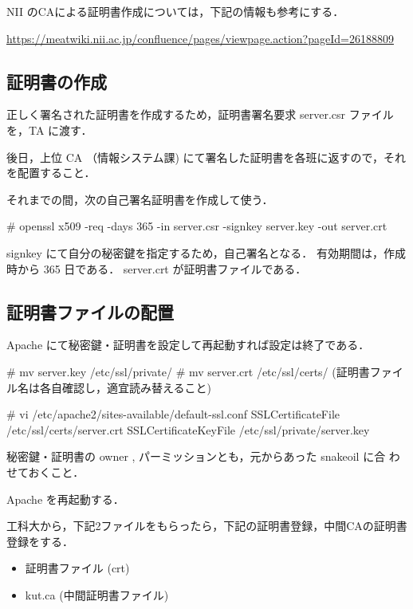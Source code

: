 NII のCAによる証明書作成については，下記の情報も参考にする．

\url{https://meatwiki.nii.ac.jp/confluence/pages/viewpage.action?pageId=26188809}

\subsection{証明書の作成}

正しく署名された証明書を作成するため，証明書署名要求 server.csr ファイル
を，TA に渡す．

後日，上位 CA （情報システム課) にて署名した証明書を各班に返すので，それ
を配置すること．

それまでの間，次の自己署名証明書を作成して使う．

\begin{cli}
# openssl x509 -req -days 365 -in server.csr -signkey server.key -out server.crt

signkey にて自分の秘密鍵を指定するため，自己署名となる．
有効期間は，作成時から 365 日である．
server.crt が証明書ファイルである．
\end{cli}

\subsection{証明書ファイルの配置}

Apache にて秘密鍵・証明書を設定して再起動すれば設定は終了である．

\begin{cli}
# mv server.key /etc/ssl/private/
# mv server.crt /etc/ssl/certs/
(証明書ファイル名は各自確認し，適宜読み替えること)

# vi /etc/apache2/sites-available/default-ssl.conf
SSLCertificateFile      /etc/ssl/certs/server.crt
SSLCertificateKeyFile /etc/ssl/private/server.key

秘密鍵・証明書の owner , パーミッションとも，元からあった snakeoil に合
わせておくこと．

Apache を再起動する．
\end{cli}

工科大から，下記2ファイルをもらったら，下記の証明書登録，中間CAの証明書
登録をする．

\begin{itemize}
    \item 証明書ファイル (crt)
    \item kut.ca (中間証明書ファイル)
\end{itemize}

